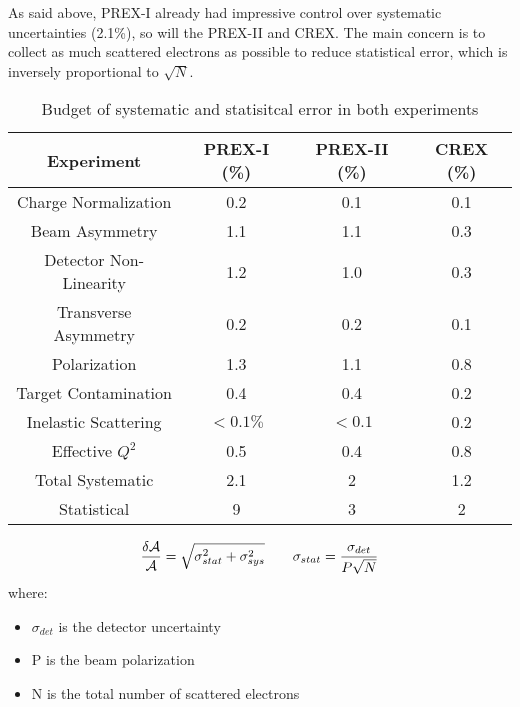 As said above, PREX-I already had impressive control over systematic uncertainties (2.1\%),
so will the PREX-II and CREX. The main concern is to collect as much scattered 
electrons as possible to reduce statistical error, which is inversely 
proportional to $\sqrt{N}$.
\begin{table}
    \centering
    \begin{tabular}{c| c c c}
	\hline
	Experiment  & PREX-I (\%)   & PREX-II (\%)	& CREX (\%)	\\
	\hline
	Charge Normalization	& 0.2	& 0.1	& 0.1	\\
	Beam Asymmetry		& 1.1	& 1.1	& 0.3	\\
	Detector Non-Linearity	& 1.2	& 1.0	& 0.3	\\
	Transverse Asymmetry	& 0.2	& 0.2	& 0.1	\\
	Polarization		& 1.3	& 1.1	& 0.8	\\
	Target Contamination	& 0.4	& 0.4	& 0.2	\\
	Inelastic Scattering	& $<0.1\%$  & $<0.1$    & 0.2   \\
	Effective $Q^2$		& 0.5	& 0.4	& 0.8	\\
	\hline
	Total Systematic	& 2.1	& 2	& 1.2	\\
	Statistical		& 9	& 3	& 2	\\
	\hline
    \end{tabular}
    \caption{Budget of systematic and statisitcal error in both experiments 
    \cite{prex-II_proposal, crex_proposal}
    }
\end{table}

\begin{equation}
    \frac{\delta \mathcal{A}}{\mathcal{A}} = \sqrt{\sigma^2_{stat} + \sigma^2_{sys}}	\qquad 
    \sigma_{stat} = \frac{\sigma_{det}}{P\sqrt{N}}
\end{equation}
where:
\begin{itemize}
    \item $\sigma_{det}$ is the detector uncertainty
    \item P is the beam polarization
    \item N is the total number of scattered electrons
\end{itemize}

